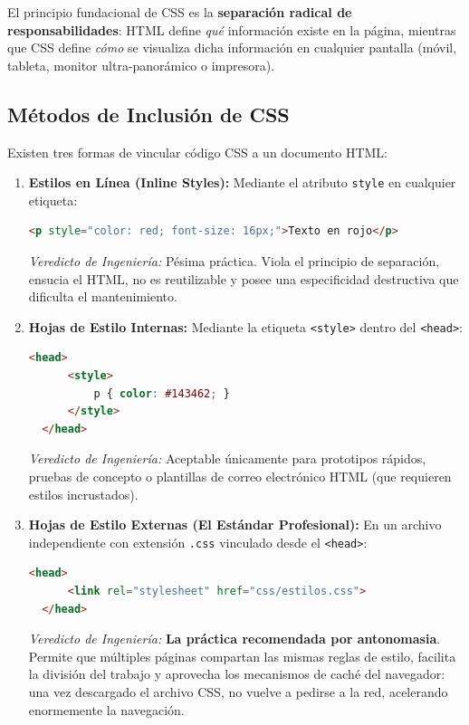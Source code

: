 El principio fundacional de CSS es la \textbf{separación radical de responsabilidades}: HTML define \textit{qué} información existe en la página, mientras que CSS define \textit{cómo} se visualiza dicha información en cualquier pantalla (móvil, tableta, monitor ultra-panorámico o impresora).

\subsection{Métodos de Inclusión de CSS}

Existen tres formas de vincular código CSS a un documento HTML:

\begin{enumerate}
  \item \textbf{Estilos en Línea (Inline Styles):} Mediante el atributo \texttt{style} en cualquier etiqueta:
  \begin{lstlisting}[language=HTML]
  <p style="color: red; font-size: 16px;">Texto en rojo</p>
  \end{lstlisting}
  \textit{Veredicto de Ingeniería:} Pésima práctica. Viola el principio de separación, ensucia el HTML, no es reutilizable y posee una especificidad destructiva que dificulta el mantenimiento.
  \item \textbf{Hojas de Estilo Internas:} Mediante la etiqueta \texttt{<style>} dentro del \texttt{<head>}:
  \begin{lstlisting}[language=HTML]
  <head>
      <style>
          p { color: #143462; }
      </style>
  </head>
  \end{lstlisting}
  \textit{Veredicto de Ingeniería:} Aceptable únicamente para prototipos rápidos, pruebas de concepto o plantillas de correo electrónico HTML (que requieren estilos incrustados).
  \item \textbf{Hojas de Estilo Externas (El Estándar Profesional):} En un archivo independiente con extensión \texttt{.css} vinculado desde el \texttt{<head>}:
  \begin{lstlisting}[language=HTML]
  <head>
      <link rel="stylesheet" href="css/estilos.css">
  </head>
  \end{lstlisting}
  \textit{Veredicto de Ingeniería:} \textbf{La práctica recomendada por antonomasia}. Permite que múltiples páginas compartan las mismas reglas de estilo, facilita la división del trabajo y aprovecha los mecanismos de caché del navegador: una vez descargado el archivo CSS, no vuelve a pedirse a la red, acelerando enormemente la navegación.
\end{enumerate}

